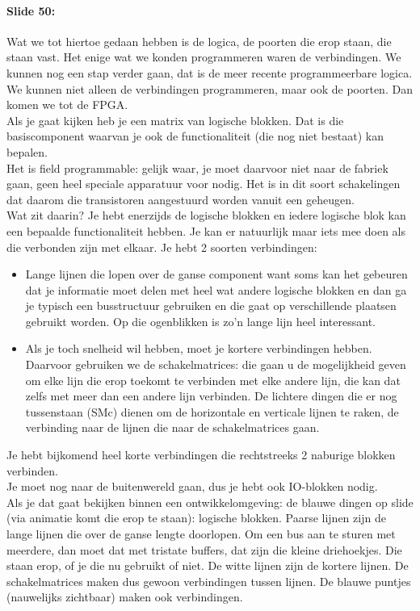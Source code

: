 \documentclass[10pt,a4paper]{book}
\begin{document}
\paragraph{Slide 50:} Wat we tot hiertoe gedaan hebben is de logica, de poorten die erop staan, die staan vast. Het enige wat we konden programmeren waren de verbindingen. We kunnen nog een stap verder gaan, dat is de meer recente programmeerbare logica. We kunnen niet alleen de verbindingen programmeren, maar ook de poorten. Dan komen we tot de FPGA. \\
Als je gaat kijken heb je een matrix van logische blokken. Dat is die basiscomponent waarvan je ook de functionaliteit (die nog niet bestaat) kan bepalen.\\
Het is field programmable: gelijk waar, je moet daarvoor niet naar de fabriek gaan, geen heel speciale apparatuur voor nodig. Het is in dit soort schakelingen dat daarom die transistoren aangestuurd worden vanuit een geheugen.\\
Wat zit daarin? Je hebt enerzijds de logische blokken en iedere logische blok kan een bepaalde functionaliteit hebben. Je kan er natuurlijk maar iets mee doen als die verbonden zijn met elkaar. Je hebt 2 soorten verbindingen:
\begin{itemize}
\item Lange lijnen die lopen over de ganse component want soms kan het gebeuren dat je informatie moet delen met heel wat andere logische blokken en dan ga je typisch een busstructuur gebruiken en die gaat op verschillende plaatsen gebruikt worden. Op die ogenblikken is zo'n lange lijn heel interessant. 
\item Als je toch snelheid wil hebben, moet je kortere verbindingen hebben. Daarvoor gebruiken we de schakelmatrices: die gaan u de mogelijkheid geven om elke lijn die erop toekomt te verbinden met elke andere lijn, die kan dat zelfs met meer dan een andere lijn verbinden. De lichtere dingen die er nog tussenstaan (SMc) dienen om de horizontale en verticale lijnen te raken, de verbinding naar de lijnen die naar de schakelmatrices gaan. 
\end{itemize}
Je hebt bijkomend heel korte verbindingen die rechtstreeks 2 naburige blokken verbinden.\\
Je moet nog naar de buitenwereld gaan, dus je hebt ook IO-blokken nodig.\\
Als je dat gaat bekijken binnen een ontwikkelomgeving: de blauwe dingen op slide (via animatie komt die erop te staan): logische blokken. Paarse lijnen zijn de lange lijnen die over de ganse lengte doorlopen. Om een bus aan te sturen met meerdere, dan moet dat met tristate buffers, dat zijn die kleine driehoekjes. Die staan erop, of je die nu gebruikt of niet. De witte lijnen zijn de kortere lijnen. De schakelmatrices maken dus gewoon verbindingen tussen lijnen. De blauwe puntjes (nauwelijks zichtbaar) maken ook verbindingen.
\end{document}
